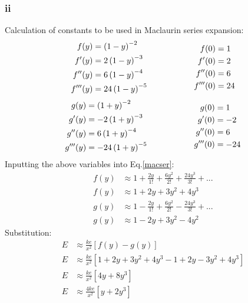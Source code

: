 \documentclass[11pt]{article}
\numberwithin{equation}{section}
\begin{document}
\subsubsection*{ii}
Calculation of constants to be used in Maclaurin series expansion:
\begin{equation*}
	\begin{aligned}[c]
		f(y) &= \left( 1 - y \right)^{-2}\\
		f'(y) &= 2\left(1-y\right)^{-3}\\
		f''(y) &= 6\left(1-y\right)^{-4}\\
		f'''(y) &= 24\left(1-y\right)^{-5}
	\end{aligned}
	\makebox[2cm]{}
	\begin{aligned}[c]
		f(0) &= 1\\
		f'(0) &= 2\\
		f''(0) &= 6\\
		f'''(0) &= 24\\
	\end{aligned}
\end{equation*}
\begin{equation*}
	\begin{aligned}[c]
		g(y) &= \left( 1 + y \right)^{-2}\\
		g'(y) &= -2\left(1+y\right)^{-3}\\
		g''(y) &= 6\left(1+y\right)^{-4}\\
		g'''(y) &= -24\left(1+y\right)^{-5}
	\end{aligned}
	\makebox[2cm]{}
	\begin{aligned}[c]
		g(0) &= 1\\
		g'(0) &= -2\\
		g''(0) &= 6\\
		g'''(0) &= -24\\
	\end{aligned}
\end{equation*}
Inputting the above variables into Eq.\ref{macser}:
\begin{align}
	f(y) &\approx 1 + \frac{2 y}{1!} + \frac{6y^2}{2!} + \frac{24y^3}{3!} + ...\\
	f(y) &\approx 1 + 2y + 3y^2 + 4y^3 \\ 
	g(y) &\approx 1 - \frac{2 y}{1!} + \frac{6y^2}{2!} - \frac{24y^3}{3!} + ...\\
	g(y) &\approx 1 - 2y + 3y^2 - 4y^2
\end{align}
Substitution:
\begin{align}
	E &\approx \frac{ke}{x^2} \left[ f(y) - g(y)\right]\\
	E &\approx \frac{ke}{x^2} \left[ 1 + 2y + 3y^2 + 4y^3 - 1 + 2y - 3y^2 + 4y^3 \right]\\
	E &\approx \frac{ke}{x^2}\left[ 4y + 8y^3 \right]\\
	E &\approx \frac{4ke}{x^2}\left[ y + 2y^3 \right]
\end{align}
\end{document}
